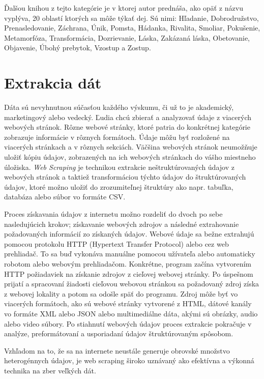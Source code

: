 Ďalšou knihou z tejto kategórie je  \cite{Tobias:1993} v ktorej autor prednáša, ako opäť z názvu vyplýva, 20 oblastí ktorých sa môže týkať dej. Sú nimi: Hľadanie, Dobrodružstvo, Prenasledovanie, Záchrana, Únik, Pomsta, Hádanka, Rivalita, Smoliar, Pokušenie, Metamorfóza, Transformácia, Dozrievanie, Láska, Zakázaná láska, Obetovanie, Objavenie, Úbohý prebytok, Vzostup a Zostup. 


\section{Extrakcia dát}
\label{webscraping}

Dáta sú nevyhnutnou súčasťou každého výskumu, či už to je akademický, marketingový alebo vedecký. Ľudia chcú zbierať a analyzovať údaje z viacerých webových stránok. Rôzne webové stránky, ktoré patria do konkrétnej kategórie zobrazuje informácie v rôznych formátoch. Údaje môžu byť rozložené na viacerých stránkach a v rôznych sekciách. Väčšina webových stránok neumožňuje uložiť kópiu údajov, zobrazených na ich webových stránkach do vášho miestneho úložiska. \textit{Web Scraping} je technikou extrakcie neštruktúrovaných údajov z webových stránok a taktiež transformáciou týchto údajov do štruktúrovaných údajov, ktoré možno uložiť do zrozumiteľnej štruktúry ako napr. tabuľka, databáza alebo súbor vo formáte CSV. 

Proces získavania údajov z internetu možno rozdeliť do dvoch po sebe nasledujúcich krokov; získavanie webových zdrojov a následné extrahovanie požadovaných informácií zo získaných údajov. Webové údaje sa bežne extrahujú pomocou protokolu HTTP (Hypertext Transfer Protocol) alebo cez web prehliadač. To sa buď vykonáva manuálne pomocou užívateľa alebo automaticky robotom alebo webovým prehliadačom. Konkrétne, program začína vytvorením HTTP požiadaviek na získanie zdrojov z cieľovej webovej stránky. Po úspešnom prijatí a spracovaní žiadosti cieľovou webovou stránkou sa požadovaný zdroj získa z webovej lokality a potom sa odošle späť do programu. Zdroj môže byť vo viacerých formátoch, ako sú webové stránky vytvorené z HTML, dátové kanály vo formáte XML alebo JSON alebo multimediálne dáta, akými sú obrázky, audio alebo video súbory. Po stiahnutí webových údajov proces extrakcie pokračuje v analýze, preformátovaní a usporiadaní údajov štruktúrovaným spôsobom. 

Vzhľadom na to, že sa na internete neustále generuje obrovské množstvo heterogénnych údajov, je web scraping široko uznávaný ako efektívna a výkonná technika na zber veľkých dát. 

